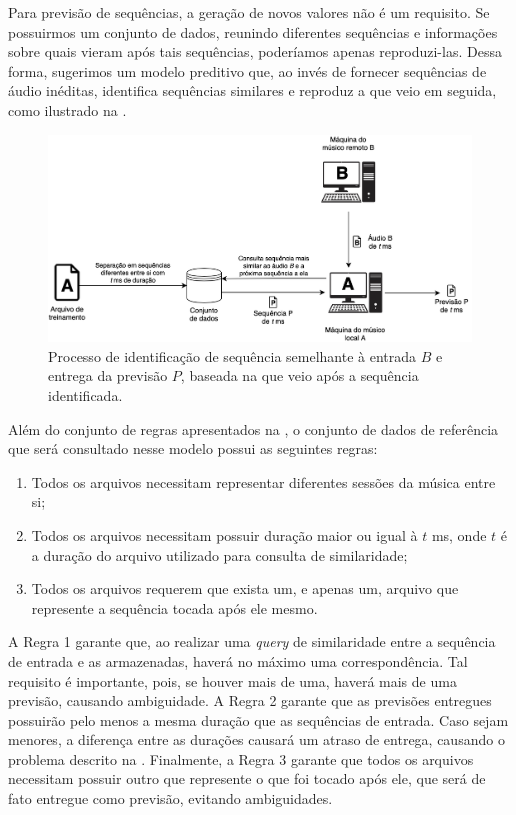 Para previsão de sequências, a geração de novos valores não é um requisito. Se possuirmos um conjunto de dados, reunindo diferentes sequências e informações sobre quais vieram após tais sequências, poderíamos apenas reproduzi-las. Dessa forma, sugerimos um modelo preditivo que, ao invés de fornecer sequências de áudio inéditas, identifica sequências similares e reproduz a que veio em seguida, como ilustrado na .

\begin{figure}[htbp]
    \centering
    \includegraphics[width=1\textwidth]{images/index-model.png}
    \caption{Processo de identificação de sequência semelhante à entrada $B$ e entrega da previsão $P$, baseada na que veio após a sequência identificada.}
    \label{fig:indexative_model}
\end{figure}

Além do conjunto de regras apresentados na , o conjunto de dados de referência que será consultado nesse modelo possui as seguintes regras:

\begin{enumerate}
    \item Todos os arquivos necessitam representar diferentes sessões da música entre si;
    \item Todos os arquivos necessitam possuir duração maior ou igual à $t$ ms, onde $t$ é a duração do arquivo utilizado para consulta de similaridade;
    \item Todos os arquivos requerem que exista um, e apenas um, arquivo que represente a sequência tocada após ele mesmo.
\end{enumerate}

A Regra 1 garante que, ao realizar uma \textit{query} de similaridade entre a sequência de entrada e as armazenadas, haverá no máximo uma correspondência. Tal requisito é importante, pois, se houver mais de uma, haverá mais de uma previsão, causando ambiguidade. A Regra 2 garante que as previsões entregues possuirão pelo menos a mesma duração que as sequências de entrada. Caso sejam menores, a diferença entre as durações causará um atraso de entrega, causando o problema descrito na . Finalmente, a Regra 3 garante que todos os arquivos necessitam possuir outro que represente o que foi tocado após ele, que será de fato entregue como previsão, evitando ambiguidades.


